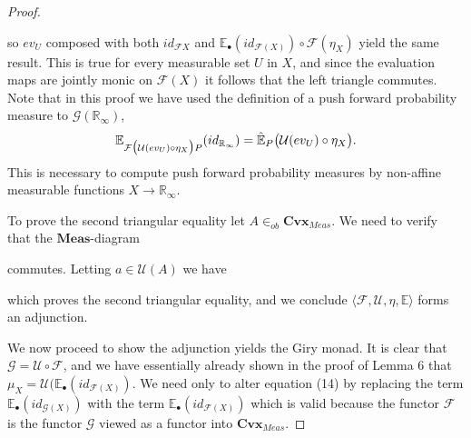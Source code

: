 \documentclass[11pt]{amsart}    %
\newcommand{\Rinf}{\mathbb{R}_{\infty}}
\newcommand{\F}{\mathcal{F}}
\newcommand{\G}{\mathcal{G}}
\begin{document}
\begin{proof}
\begin{center}
\end{center}
so $ev_U$ composed with both $id_{\mathcal{F}X}$ and $\mathbb{E}_{\bullet}(id_{\mathcal{F}(X)}) \circ \mathcal{F}(\eta_X)$ yield the same result.  This is true for every measurable set $U$ in $X$, and since the evaluation maps are jointly monic on $\mathcal{F}(X)$ it follows that the left triangle commutes.  Note that in this proof we have used the definition of a push forward probability measure to $\G(\Rinf)$, 
$$
\mathbb{E}_{\mathcal{F}\big( \mathcal{U}(ev_{\small{U}}) \circ \eta_X\big)P}(id_{\Rinf}) = \hat{\mathbb{E}}_P\big( \mathcal{U}(ev_{\tiny{U}}) \circ \eta_X\big).
$$
This is necessary to compute push forward probability measures by non-affine measurable functions $X \rightarrow \Rinf$.

To prove the second triangular equality let $A \in_{ob} \mathbf{Cvx}_{Meas}$.  We need to verify that the $\mathbf{Meas}$-diagram 
\begin{center}
\end{center}
commutes.  Letting $a \in \mathcal{U}(A)$ we have
\begin{center}
\end{center}
which proves the second triangular equality, and we conclude $\langle \mathcal{F}, \mathcal{U}, \eta, \mathbb{E} \rangle$ forms an adjunction.

We now proceed to show the adjunction yields the Giry monad.  It is clear that $\G = \mathcal{U} \circ \mathcal{F}$, and we have essentially already shown in the proof of Lemma 6 that $\mu_X = \mathcal{U}\big(\mathbb{E}_{\bullet}(id_{\mathcal{F}(X)})$.  We need only to alter equation (14) by replacing the term $\mathbb{E}_{\bullet}(id_{\G(X)})$ with the term $\mathbb{E}_{\bullet}(id_{\F(X)})$ which is valid because the functor $\F$ is the functor $\G$ viewed as a functor into $\mathbf{Cvx}_{Meas}$.
\end{proof}
\end{document}
